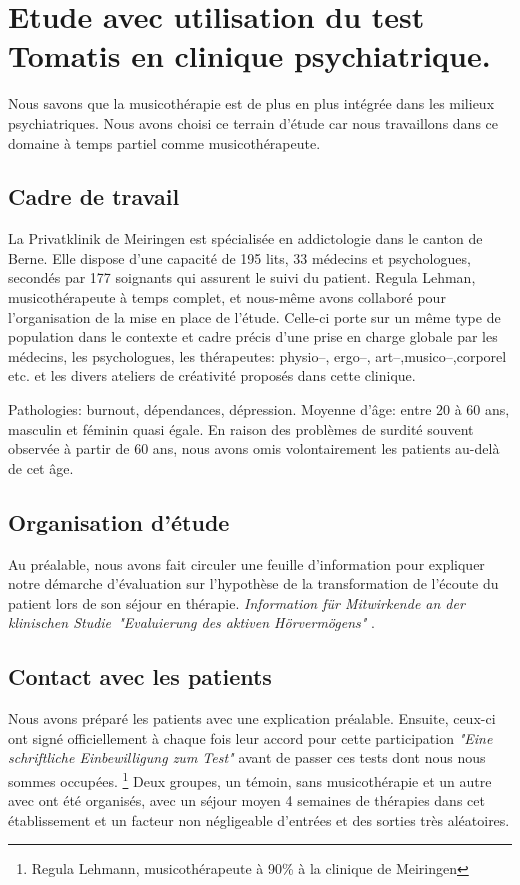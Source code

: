 \chapter{Etude avec utilisation du test Tomatis en clinique psychiatrique.}
Nous savons que la musicothérapie est de plus en plus intégrée dans
les milieux psychiatriques. Nous avons choisi ce terrain d'étude car 
nous  travaillons dans ce domaine  à temps partiel comme musicothérapeute.
\section{Cadre de travail}
 La Privatklinik
de Meiringen est  spécialisée en
addictologie dans le canton de Berne. Elle dispose d'une capacité de 195 lits, 33 médecins et
psychologues, secondés par 177 soignants qui assurent le suivi du
patient. Regula Lehman, musicothérapeute à temps complet, et nous-même avons
collaboré  pour l'organisation de la mise en place de l'étude. Celle-ci porte sur un même type de
population dans le contexte et cadre  précis d'une prise en charge globale
par les médecins, les psychologues, les thérapeutes: physio--,
ergo--, art--,musico--,corporel etc. et les divers ateliers de créativité proposés dans
cette clinique. 

Pathologies:  burnout, dépendances,
dépression.
Moyenne d'âge:  entre 20 à 60 ans, masculin et
féminin quasi égale. 
En raison des problèmes de surdité souvent observée à partir de 60 ans, nous avons omis volontairement les patients au-delà de cet âge.
\section{Organisation d'étude}

Au préalable, nous avons fait circuler une
feuille d'information pour expliquer notre démarche d'évaluation sur
l'hypothèse de la transformation de l'écoute du patient lors de son
séjour en thérapie. \emph{Information für Mitwirkende an der klinischen
Studie\  "Evaluierung des aktiven Hörvermögens" }. 
 
 \section{Contact avec les patients}
 
 Nous avons
préparé les patients avec une explication préalable. Ensuite,
ceux-ci ont signé officiellement à chaque fois leur
accord pour cette participation  \emph{"Eine schriftliche Einbewilligung zum
Test"} avant de passer ces tests dont nous nous sommes occupées.
  \footnote{Regula
  Lehmann, musicothérapeute  à 90\%  à la clinique de Meiringen} Deux groupes, un témoin, sans
musicothérapie et un autre avec ont été organisés, avec un séjour moyen 4 semaines de thérapies dans cet établissement et un facteur non négligeable d'entrées et des sorties très aléatoires.


